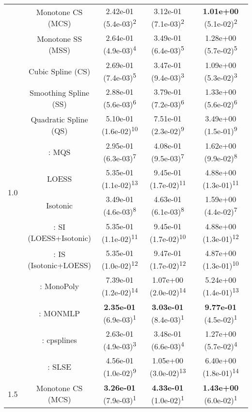 \begin{tabular}{ccccc}
\midrule
\multirow{14}{*}{1.0}&Monotone CS (MCS)& 2.42e-01 (5.4e-03)\textsuperscript{2}& 3.12e-01 (7.1e-03)\textsuperscript{2}& \textbf{1.01e+00} (5.1e-02)\textsuperscript{2}\tabularnewline
&Monotone SS (MSS)& 2.64e-01 (4.9e-03)\textsuperscript{4}& 3.49e-01 (6.4e-03)\textsuperscript{5}& 1.28e+00 (5.7e-02)\textsuperscript{5}\tabularnewline
&Cubic Spline (CS)& 2.69e-01 (7.4e-03)\textsuperscript{5}& 3.47e-01 (9.4e-03)\textsuperscript{3}& 1.09e+00 (5.3e-02)\textsuperscript{3}\tabularnewline
&Smoothing Spline (SS)& 2.88e-01 (5.6e-03)\textsuperscript{6}& 3.79e-01 (7.2e-03)\textsuperscript{6}& 1.33e+00 (5.6e-02)\textsuperscript{6}\tabularnewline
&Quadratic Spline (QS)& 5.10e-01 (1.6e-02)\textsuperscript{10}& 7.51e-01 (2.3e-02)\textsuperscript{9}& 3.49e+00 (1.5e-01)\textsuperscript{9}\tabularnewline
&\textcite{heMonotoneBsplineSmoothing1998}: MQS& 2.95e-01 (6.3e-03)\textsuperscript{7}& 4.08e-01 (9.5e-03)\textsuperscript{7}& 1.62e+00 (9.9e-02)\textsuperscript{8}\tabularnewline
&LOESS& 5.35e-01 (1.1e-02)\textsuperscript{13}& 9.45e-01 (1.7e-02)\textsuperscript{11}& 4.88e+00 (1.3e-01)\textsuperscript{11}\tabularnewline
&Isotonic& 3.49e-01 (4.6e-03)\textsuperscript{8}& 4.63e-01 (6.1e-03)\textsuperscript{8}& 1.59e+00 (4.4e-02)\textsuperscript{7}\tabularnewline
&\textcite{mammenEstimatingSmoothMonotone1991}: SI (LOESS+Isotonic)& 5.35e-01 (1.1e-02)\textsuperscript{11}& 9.45e-01 (1.7e-02)\textsuperscript{10}& 4.88e+00 (1.3e-01)\textsuperscript{12}\tabularnewline
&\textcite{mammenEstimatingSmoothMonotone1991}: IS (Isotonic+LOESS)& 5.35e-01 (1.0e-02)\textsuperscript{12}& 9.47e-01 (1.7e-02)\textsuperscript{12}& 4.87e+00 (1.3e-01)\textsuperscript{10}\tabularnewline
&\textcite{murrayFastFlexibleMethods2016}: MonoPoly& 7.39e-01 (1.2e-02)\textsuperscript{14}& 1.07e+00 (2.0e-02)\textsuperscript{14}& 5.24e+00 (1.4e-01)\textsuperscript{13}\tabularnewline
&\textcite{cannonMonmlpMultilayerPerceptron2017}: MONMLP& \textbf{2.35e-01} (6.9e-03)\textsuperscript{1}& \textbf{3.03e-01} (8.4e-03)\textsuperscript{1}& \textbf{9.77e-01} (4.5e-02)\textsuperscript{1}\tabularnewline
&\textcite{navarro-garciaConstrainedSmoothingOutofrange2023}: cpsplines& 2.63e-01 (4.9e-03)\textsuperscript{3}& 3.48e-01 (6.6e-03)\textsuperscript{4}& 1.27e+00 (5.7e-02)\textsuperscript{4}\tabularnewline
&\textcite{groeneboomConfidenceIntervalsMonotone2023}: SLSE& 4.56e-01 (1.0e-02)\textsuperscript{9}& 1.05e+00 (3.0e-02)\textsuperscript{13}& 6.40e+00 (1.8e-01)\textsuperscript{14}\tabularnewline
\midrule
\multirow{14}{*}{1.5}&Monotone CS (MCS)& \textbf{3.26e-01} (7.9e-03)\textsuperscript{1}& \textbf{4.33e-01} (1.0e-02)\textsuperscript{1}& \textbf{1.43e+00} (6.0e-02)\textsuperscript{1}\tabularnewline

\end{tabular}
